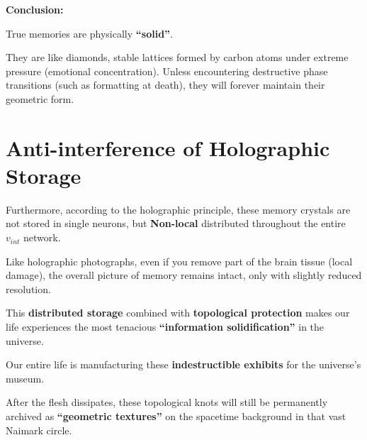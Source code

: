 \textbf{Conclusion:}

True memories are physically \textbf{``solid''}.

They are like diamonds, stable lattices formed by carbon atoms under extreme pressure (emotional concentration). Unless encountering destructive phase transitions (such as formatting at death), they will forever maintain their geometric form.

\section{Anti-interference of Holographic Storage}

Furthermore, according to the holographic principle, these memory crystals are not stored in single neurons, but \textbf{Non-local} distributed throughout the entire $v_{int}$ network.

Like holographic photographs, even if you remove part of the brain tissue (local damage), the overall picture of memory remains intact, only with slightly reduced resolution.

This \textbf{distributed storage} combined with \textbf{topological protection} makes our life experiences the most tenacious \textbf{``information solidification''} in the universe.

Our entire life is manufacturing these \textbf{indestructible exhibits} for the universe's museum.

After the flesh dissipates, these topological knots will still be permanently archived as \textbf{``geometric textures''} on the spacetime background in that vast Naimark circle.

